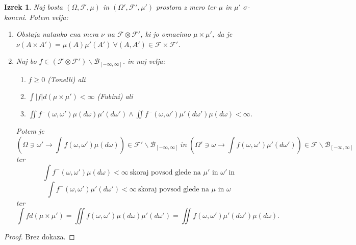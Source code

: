 \documentclass[a4paper,12pt]{article}
\theoremstyle{definition} %
\theoremstyle{plain} %
\newtheorem{izrek}[definicija]{Izrek}
\newcommand{\F}{\mathcal{F}}
\begin{document}
            \begin{izrek}
                Naj bosta $(\Omega, \F, \mu)$ in $(\Omega', \F', \mu')$ prostora z mero ter $\mu$ in $\mu'$ $\sigma$-koncni. Potem velja:
                \begin{enumerate}
                    \item Obstaja natanko ena mera $\nu$ na $\F \otimes \F'$, ki jo oznacimo $\mu \times \mu'$, da je $\nu(A \times A') = \mu(A)\mu'(A') \ \forall (A, A') \in \F \times \F'$.
                    \item Naj bo $f \in (\F \otimes \F')\backslash\mathcal{B}_{[-\infty, \infty]}$. in naj velja:
                        \begin{enumerate}
                            \item $ f \geq 0$ (Tonelli) ali
                            \item $\int|f|d(\mu \times \mu') < \infty$ (Fubini) ali
                            \item $\iint f^-(\omega, \omega')\mu(d\omega)\mu'(d\omega') \wedge \iint f^-(\omega, \omega')\mu'(d\omega')\mu(d\omega) < \infty$.
                        \end{enumerate}
                        Potem je 
                        $$
                        (\Omega \ni \omega' \rightarrow \int f(\omega, \omega')\mu(d\omega)) \in \F'\backslash\mathcal{B}_{[-\infty, \infty]}\ in \
                        (\Omega' \ni \omega \rightarrow \int f(\omega, \omega')\mu'(d\omega')) \in \F\backslash\mathcal{B}_{[-\infty, \infty]}
                        $$
                        ter
                        $$
                        \int f^-(\omega, \omega')\mu(d\omega) < \infty \ \text{skoraj povsod glede na $\mu'$ in $\omega'$} \ \text{in}
                        $$
                        $$
                        \int f^-(\omega, \omega')\mu'(d\omega') < \infty \ \text{skoraj povsod glede na $\mu$ in $\omega$}           
                        $$
                        ter
                        $$
                         \int fd(\mu\times\mu') = \iint f(\omega, \omega')\mu(d\omega)\mu'(d\omega') = \iint f(\omega, \omega')\mu'(d\omega')\mu(d\omega).
                        $$
                \end{enumerate}
            \end{izrek}

            \begin{proof}
                Brez dokaza.
            \end{proof}
\end{document}
